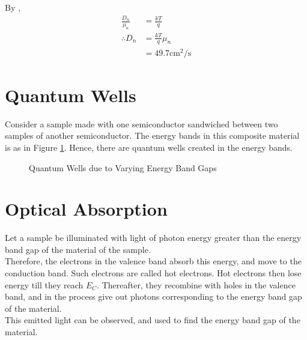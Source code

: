 \documentclass[titlepage, fleqn, a4paper, 12pt, twoside]{article}
\theoremstyle{definition}
\theoremstyle{theorem}
\begin{document}
\begin{solution}
	By ,
	\begin{align*}
		\frac{D_n}{\mu_n} &= \frac{k T}{q}\\
		\therefore D_n &= \frac{k T}{q} \mu_n\\
		&= 49.7 \si{\centi\metre\squared\per\second}
	\end{align*}
\end{solution}

\section{Quantum Wells}

Consider a sample made with one semiconductor sandwiched between two samples of another semiconductor.
The energy bands in this composite material is as in Figure \ref{fig:Quantum_Wells_due_to_Varying_Energy_Band_Gaps}.
Hence, there are quantum wells created in the energy bands.

\begin{figure}[h]
	\centering
	\caption{Quantum Wells due to Varying Energy Band Gaps}
	\label{fig:Quantum_Wells_due_to_Varying_Energy_Band_Gaps}
\end{figure}

\section{Optical Absorption}

Let a sample be illuminated with light of photon energy greater than the energy band gap of the material of the sample.\\
Therefore, the electrons in the valence band absorb this energy, and move to the conduction band.
Such electrons are called hot electrons.
Hot electrons then lose energy till they reach $E_C$.
Thereafter, they recombine with holes in the valence band, and in the process give out photons corresponding to the energy band gap of the material.\\
This emitted light can be observed, and used to find the energy band gap of the material.
\end{document}
